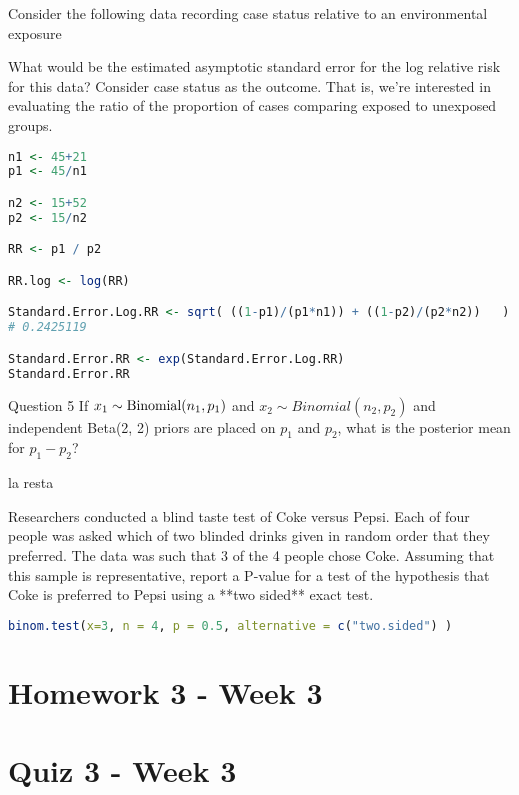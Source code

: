 \documentclass{homework}
\begin{document}
\begin{tcolorbox}[title=Question 4]
Consider the following data recording case status relative to an environmental exposure


What would be the estimated asymptotic standard error for the log relative risk for this data? Consider case status as the outcome. That is, we're interested in evaluating the ratio of the proportion of cases comparing exposed to unexposed groups. 
\end{tcolorbox}

\begin{lstlisting}[language=R]
n1 <- 45+21
p1 <- 45/n1

n2 <- 15+52
p2 <- 15/n2

RR <- p1 / p2

RR.log <- log(RR) 

Standard.Error.Log.RR <- sqrt( ((1-p1)/(p1*n1)) + ((1-p2)/(p2*n2))   )
# 0.2425119

Standard.Error.RR <- exp(Standard.Error.Log.RR) 
Standard.Error.RR
\end{lstlisting}

\begin{tcolorbox}[title=Question 5]
Question 5
If $x_1 \sim \textnormal{Binomial}(n_1, p_1)$ and $x_2 \sim Binomial(n_2, p_2)$ and independent Beta(2, 2) priors are placed on $p_1$ and $p_2$, what is the posterior mean for $p_1 - p_2$?
\end{tcolorbox}

la resta 

\begin{tcolorbox}[title=Question 6]
Researchers conducted a blind taste test of Coke versus Pepsi. Each of four people was asked which of two blinded drinks given in random order that they preferred. The data was such that 3 of the 4 people chose Coke. Assuming that this sample is representative, report a P-value for a test of the hypothesis that Coke is preferred to Pepsi using a **two sided** exact test.
\end{tcolorbox}

\begin{lstlisting}[language=R]
binom.test(x=3, n = 4, p = 0.5, alternative = c("two.sided") )
\end{lstlisting}

\clearpage

\section{Homework 3 - Week 3}

\section{Quiz 3 - Week 3}
\end{document}
